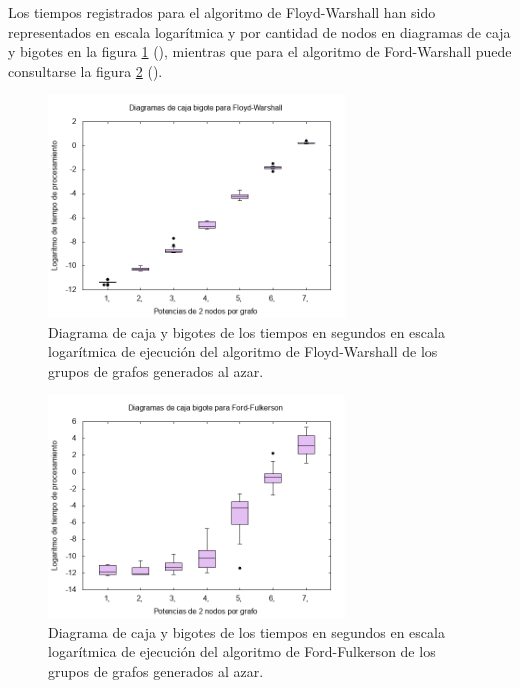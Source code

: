 \documentclass{article}
\begin{document}
  Los tiempos registrados para el algoritmo de Floyd-Warshall han sido representados en escala logarítmica y por cantidad de nodos en diagramas de caja y bigotes en la figura \ref{fig:boxplotFloyd} (\pageref{fig:boxplotFloyd}), mientras que para el algoritmo de Ford-Warshall puede consultarse la figura \ref{fig:boxplotFord} (\pageref{fig:boxplotFord}).

  \begin{figure}[h]
    \includegraphics[width=0.7\textwidth]{boxplotFloyd} %
    \centering
    \caption{Diagrama de caja y bigotes de los tiempos en segundos en escala logarítmica de ejecución del algoritmo de Floyd-Warshall de los grupos de grafos generados al azar.}
    \label{fig:boxplotFloyd}
  \end{figure}

  \begin{figure}[h]
    \includegraphics[width=0.7\textwidth]{boxplotFord} %
    \centering
    \caption{Diagrama de caja y bigotes de los tiempos en segundos en escala logarítmica de ejecución del algoritmo de Ford-Fulkerson de los grupos de grafos generados al azar.}
    \label{fig:boxplotFord}
  \end{figure}

\end{document}
